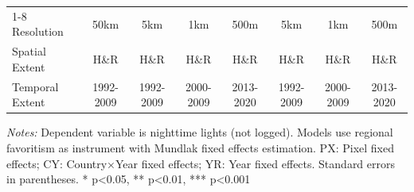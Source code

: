 \begin{table}[htbp]
\begin{tabular}{lccccccc}
\cmidrule(lr){1-8}
Resolution & 50km & 5km & 1km & 500m & 5km & 1km & 500m \\
Spatial Extent & H\&R & H\&R & H\&R & H\&R & H\&R & H\&R & H\&R \\
Temporal Extent & 1992-2009 & 1992-2009 & 2000-2009 & 2013-2020 & 1992-2009 & 2000-2009 & 2013-2020 \\
\bottomrule
\end{tabular}
\begin{threeparttable}
\begin{tablenotes}\small
\item \textit{Notes:} Dependent variable is nighttime lights (not logged). Models use regional favoritism as instrument with Mundlak fixed effects estimation. PX: Pixel fixed effects; CY: Country×Year fixed effects; YR: Year fixed effects. Standard errors in parentheses. * p<0.05, ** p<0.01, *** p<0.001
\end{tablenotes}
\end{threeparttable}
\end{table}